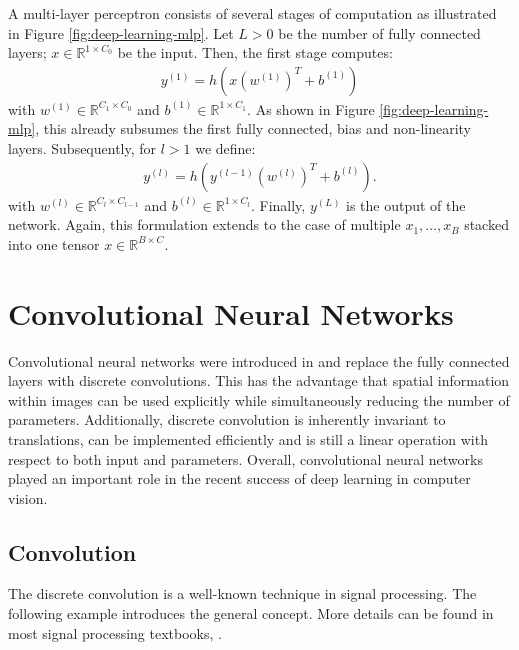 \begin{example}
  \label{ex:deep-learning-mlp}
  A multi-layer perceptron consists of several stages of computation as illustrated
  in Figure \ref{fig:deep-learning-mlp}. Let $L > 0$ 
  be the number of fully connected layers; $x \in \mathbb{R}^{1 \times C_0}$
  be the input. Then, the first stage computes:
  \begin{align}
    y^{(1)} = h\left(x (w^{(1)})^T + b^{(1)}\right)
  \end{align}
  with $w^{(1)} \in \mathbb{R}^{C_1 \times C_0}$ and $b^{(1)} \in \mathbb{R}^{1 \times C_1}$.
  As shown in Figure
  \ref{fig:deep-learning-mlp}, this already subsumes the first fully connected,
  bias and non-linearity layers. Subsequently, for $l > 1$ we define:
  \begin{align}
    y^{(l)} = h\left(y^{(l - 1)} (w^{(l)})^T + b^{(l)}\right).\label{eq:deep-learning-mlp}
  \end{align}
  with $w^{(l)} \in \mathbb{R}^{C_l \times C_{l - 1}}$ and
  $b^{(l)} \in \mathbb{R}^{1 \times C_l}$. Finally, $y^{(L)}$ is the output
  of the network. Again, this formulation extends to the case of
  multiple $x_1,\ldots,x_B$ stacked into one tensor $x \in \mathbb{R}^{B \times C}$.
\end{example}

\section{Convolutional Neural Networks}

Convolutional neural networks were introduced in
\cite{LeCunBoserDenkerHenderson:1989} and replace the fully connected layers
with discrete convolutions. This has the advantage that spatial information
within images can be used explicitly while simultaneously reducing the number
of parameters. Additionally, discrete convolution is inherently invariant
to translations, can be implemented efficiently and is still a linear operation
with respect to both input and parameters. Overall, convolutional neural networks
played an important role in the recent success of deep learning in computer
vision.

\subsection{Convolution}

The discrete convolution is a well-known technique in signal processing.
The following example introduces the general concept. More details can be found
in most signal processing textbooks, \eg \cite{Gonzalez:2006}.


